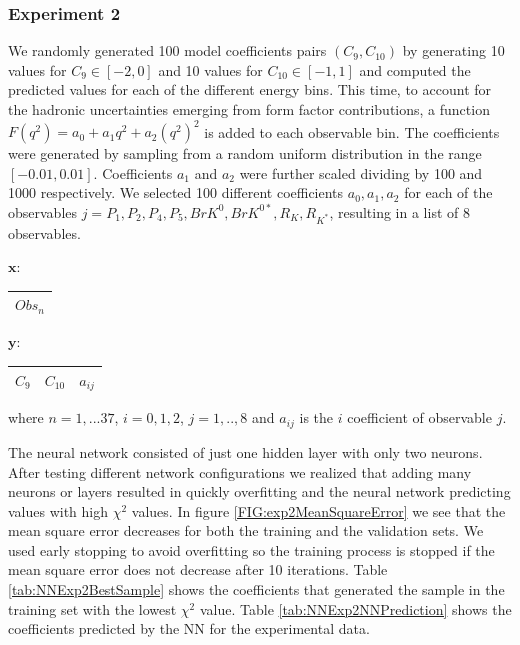 \documentclass[a4paper,fleqn]{cas-dc}
\begin{document}
\subsubsection{Experiment 2}
We randomly generated 100 model coefficients pairs \( (C_9, C_{10})\) by generating 10 values for  \(C_9 \in [-2, 0] \) and 10 values for \(C_{10} \in [-1, 1] \) and computed the predicted values for each of the different energy bins. This time, to account for the hadronic uncertainties emerging from form factor contributions, a function \(F(q^2) = a_0 + a_1q^2 +  a_2(q^2)^2 \) is added to each observable bin. The coefficients were generated by sampling from a random uniform distribution in the range \([-0.01, 0.01]\). Coefficients \(a_1\) and \(a_2\) were further scaled dividing by 100 and 1000 respectively. We selected 100 different coefficients \(a_0, a_1, a_2\) for each of the observables   \(j = P_1, P_2,P_4,P_5,BrK^0,BrK^{0*},R_K,R_{K^*}\), resulting in a list of 8 observables. 
\begin{center}
	\(\boldsymbol{x:} \)
	\quad
	\begin{tabular}{ |c|  } 
		\hline
		\(Obs_n \)  \\
		
		\hline
	\end{tabular}
\end{center}
\begin{center}
	\(\boldsymbol{y:} \)
	\quad
	\begin{tabular}{ |c|c|c|  } 
		\hline
		\(C_9\) & \(C_{10}\) & \(a_{ij}\) \\		
		\hline
	\end{tabular}
\end{center}
where \(n=1,...37\), \(i=0,1,2\), \(j=1,..,8\) and \(a_{ij}\) is the \(i\) coefficient of observable \(j\). \par
The neural network consisted of just one hidden layer with only two neurons. After testing different network configurations we realized that adding many neurons or layers resulted in quickly overfitting and the neural network predicting values with high \(\chi^2 \) values. In figure \ref{FIG:exp2MeanSquareError} we see that the mean square error decreases for both the training and the validation sets. We used early stopping to avoid overfitting so the training process is stopped if the mean square error does not decrease after 10 iterations. Table \ref{tab:NNExp2BestSample} shows the coefficients that generated the sample in the training set with the lowest \(\chi^2\) value. Table \ref{tab:NNExp2NNPrediction} shows the coefficients predicted  by the NN for the experimental data.
\end{document}
